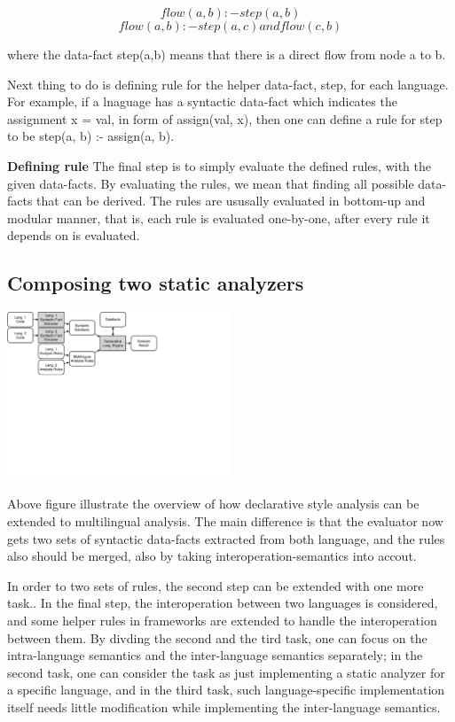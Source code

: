 \[flow(a,b) :- step(a,b)\]
\[flow(a,b) :- step(a,c) and flow(c, b)\]

where the data-fact step(a,b) means that there is a direct flow from node a to b.

Next thing to do is defining rule for the helper data-fact, step, for each
language.  For example, if a lnaguage has a syntactic data-fact which indicates
the assignment x = val, in form of assign(val, x), then one can define a rule
for step to be step(a, b) :- assign(a, b).

\textbf{Defining rule}
The final step is to simply evaluate the defined rules, with the given
data-facts.  By evaluating the rules, we mean that finding all possible
data-facts that can be derived. The rules are ususally evaluated in bottom-up
and modular manner, that is, each rule is evaluated one-by-one, after every
rule it depends on is evaluated.

\subsection{Composing two static analyzers}

\includegraphics[width=0.5\textwidth]{img/overview2}

Above figure illustrate the overview of how declarative style analysis can
be extended to multilingual analysis. The main difference is that the evaluator
now gets two sets of syntactic data-facts extracted from both language, and
the rules also should be merged, also by taking interoperation-semantics into accout.

In order to two sets of rules, the second step can be extended with one more
task..  In the final step, the interoperation between two languages is
considered, and some helper rules in frameworks are extended to handle the
interoperation between them. By divding the second and the tird task, one can
focus on the intra-language semantics and the inter-language semantics
separately; in the second task, one can consider the task as just implementing
a static analyzer for a specific language, and in the third task, such
language-specific implementation itself needs little modification while
implementing the inter-language semantics.


